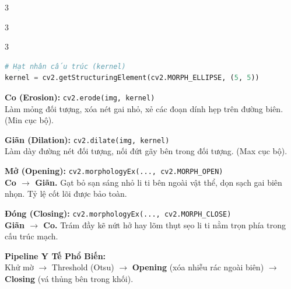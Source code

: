 \documentclass[9pt,landscape,a4paper]{extarticle}
\begin{document}
\begin{multicols*}{3}
\begin{multicols*}{3}
\begin{multicols}{3}
\begin{lstlisting}[language=Python]
# Hạt nhân cấu trúc (kernel)
kernel = cv2.getStructuringElement(cv2.MORPH_ELLIPSE, (5, 5))
\end{lstlisting}

\begin{infobox}
\textbf{Co (Erosion):} \texttt{cv2.erode(img, kernel)}\\
Làm mỏng đối tượng, xóa nét gai nhỏ, xẻ các đoạn dính hẹp trên đường biên. (Min cục bộ).
\end{infobox}

\begin{infobox}
\textbf{Giãn (Dilation):} \texttt{cv2.dilate(img, kernel)}\\
Làm dày đường nét đối tượng, nối đứt gãy bên trong đối tượng. (Max cục bộ).
\end{infobox}

\begin{infobox}
\textbf{Mở (Opening):} \texttt{cv2.morphologyEx(..., cv2.MORPH\_OPEN)}\\
\textbf{Co $\to$ Giãn.} Gạt bỏ sạn sáng nhỏ li ti bên ngoài vật thể, dọn sạch gai biên nhọn. Tỷ lệ cốt lõi được bảo toàn.
\end{infobox}

\begin{infobox}
\textbf{Đóng (Closing):} \texttt{cv2.morphologyEx(..., cv2.MORPH\_CLOSE)}\\
\textbf{Giãn $\to$ Co.} Trám đầy kẽ nứt hở hay lõm thụt sẹo li ti nằm trọn phía trong cấu trúc mạch.
\end{infobox}

\begin{notebox}
\textbf{Pipeline Y Tế Phổ Biến:}\\
Khử mờ $\to$ Threshold (Otsu) $\to$ \textbf{Opening} (xóa nhiễu rác ngoài biên) $\to$ \textbf{Closing} (vá thủng bên trong khối).
\end{notebox}

\end{multicols}

\end{multicols*}

\end{multicols*}
\end{document}
